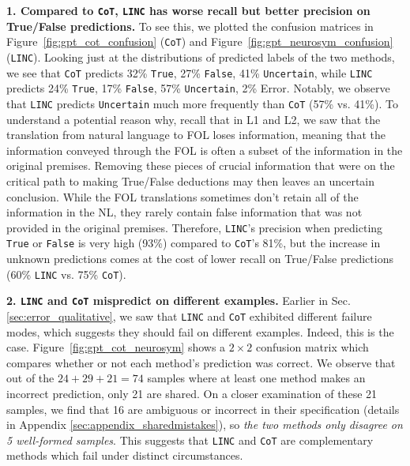 \documentclass[11pt]{article}
\begin{document}
\textbf{1. Compared to \texttt{CoT}, \texttt{LINC} has worse recall but better precision on True/False predictions.} To see this,
we plotted the confusion matrices in Figure~\ref{fig:gpt_cot_confusion} (\texttt{CoT}) and Figure~\ref{fig:gpt_neurosym_confusion} (\texttt{LINC}). 
Looking just at the distributions of predicted labels of the two methods, we see that \texttt{CoT} predicts 32\% \texttt{True}, 27\% \texttt{False}, 41\% \texttt{Uncertain}, while \texttt{LINC} predicts 24\% \texttt{True}, 17\% \texttt{False}, 57\% \texttt{Uncertain}, 2\% Error.
Notably, we observe that \texttt{LINC} predicts \texttt{Uncertain} much more frequently than \texttt{CoT} (57\% vs. 41\%).
To understand a potential reason why, recall that in L1 and L2, we saw that the translation from natural language to FOL loses information, meaning that the information conveyed through the FOL is often a subset of the information in the original premises. Removing these pieces of crucial information that were on the critical path to making True/False deductions may then leaves an uncertain conclusion. 
While the FOL translations sometimes don't retain all of the information in the NL, they rarely contain false information that was not provided in the original premises.
Therefore, \texttt{LINC}'s precision when predicting \texttt{True} or \texttt{False} is very high (93\%) compared to \texttt{CoT}'s 81\%, but the increase in unknown predictions comes at the cost of lower recall on True/False predictions (60\% \texttt{LINC} vs. 75\% \texttt{CoT}).

\textbf{2. \texttt{LINC} and \texttt{CoT} mispredict on different examples.} Earlier in Sec. \ref{sec:error_qualitative}, we saw that \texttt{LINC} and \texttt{CoT} exhibited different failure modes, which suggests they should fail on different examples. Indeed, this is the case.
Figure~\ref{fig:gpt_cot_neurosym} shows a $2\times2$ confusion matrix which compares whether or not each method's prediction was correct.
We observe that out of the $24+29+21=74$ samples where at least one method makes an incorrect prediction, only 21 are shared.
On a closer examination of these 21 samples, we find that 16 are ambiguous or incorrect in their specification (details in Appendix \ref{sec:appendix_sharedmistakes}), so \textit{the two methods only disagree on 5 well-formed samples}.
This suggests that \texttt{LINC} and \texttt{CoT} are complementary methods which fail under distinct circumstances.
\end{document}
